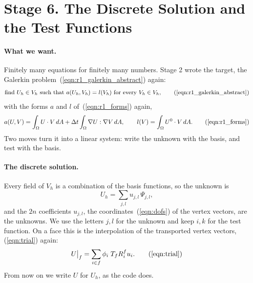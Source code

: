 \section{Stage 6. The Discrete Solution and the Test Functions}
\label{section:r1_discrete}

\paragraph{What we want.} Finitely many equations for finitely many numbers. Stage 2 wrote the target, the Galerkin problem~(\ref{eqn:r1_galerkin_abstract}) again:
\begin{equation*}
\text{find } U_h \in V_h \text{ such that } a(U_h, V_h) = l(V_h) \text{ for every } V_h \in V_h , \tag{\ref{eqn:r1_galerkin_abstract}}
\end{equation*}
with the forms $a$ and $l$ of~(\ref{eqn:r1_forms}) again,
\begin{equation*}
a(U, V) = \int_\Omega U\cdot V\, dA + \Delta t \int_\Omega \nabla U : \nabla V\, dA, \qquad l(V) = \int_\Omega U^0\cdot V\, dA . \tag{\ref{eqn:r1_forms}}
\end{equation*}
Two moves turn it into a linear system: write the unknown with the basis, and test with the basis.

\paragraph{The discrete solution.} Every field of $V_h$ is a combination of the basis functions, so the unknown is
\begin{equation}
\label{eqn:r1_trial_sum}
U_h = \sum_{j,l} u_{j,l}\, \Psi_{j,l} ,
\end{equation}
and the $2n$ coefficients $u_{j,l}$, the coordinates~(\ref{eqn:dofs}) of the vertex vectors, are the unknowns. We use the letters $j, l$ for the unknown and keep $i, k$ for the test function. On a face this is the interpolation of the transported vertex vectors, (\ref{eqn:trial}) again:
\begin{equation*}
U\big|_f = \sum_{i \in f} \phi_i\; T_f R_i^f u_i . \tag{\ref{eqn:trial}}
\end{equation*}
From now on we write $U$ for $U_h$, as the code does.

